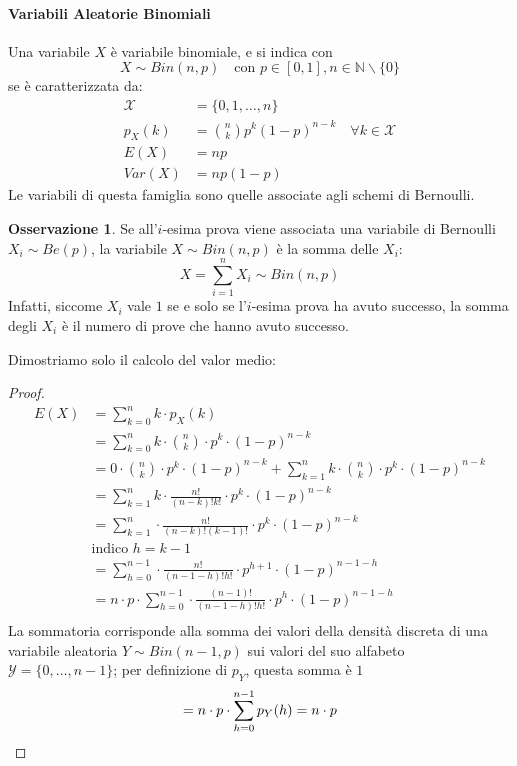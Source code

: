 \documentclass{article}
\theoremstyle{plain}
\theoremstyle{definition}
\newtheorem{osservazione}{Osservazione}[section]
\theoremstyle{remark}
\begin{document}
\paragraph{Variabili Aleatorie Binomiali} %
\label{par:variabili_aleatorie_binomiali}
Una variabile $X$ è variabile binomiale, e si indica con
\begin{equation*}
	X\sim Bin(n,p)\quad\text{con }p\in[0,1],n\in\mathds{N}\smallsetminus\{0\}
\end{equation*}
se è caratterizzata da:
\begin{align*}
	\mathcal{X}&=\{0,1,\dots,n\}\\
	p_X(k)&=\binom{n}{k} p^k (1-p)^{n-k}\quad\forall k\in\mathcal{X}\\
	E(X)&=n p\\
	Var(X)&=n p(1-p)
\end{align*}
Le variabili di questa famiglia sono quelle associate agli schemi di Bernoulli.
\begin{osservazione}
	Se all'$i$-esima prova viene associata una variabile di Bernoulli $X_i\sim Be(p)$, la variabile $X\sim Bin(n,p)$ è la somma delle $X_i$:
	\begin{equation*}
		X=\sum_{i=1}^n X_i\sim Bin(n,p)
	\end{equation*}
	Infatti, siccome $X_i$ vale $1$ se e solo se l'$i$-esima prova ha avuto successo, la somma degli $X_i$ è il numero di prove che hanno avuto successo.
\end{osservazione}
Dimostriamo solo il calcolo del valor medio:
\begin{proof}
	\begin{align*}
		E(X)&=\sum_{k=0}^n k\cdot p_X(k)\\
		&=\sum_{k=0}^n k\cdot\binom{n}{k}\cdot p^k\cdot (1-p)^{n-k}\\
		&=0\cdot\binom{n}{k}\cdot p^k\cdot (1-p)^{n-k}+\sum_{k=1}^n k\cdot\binom{n}{k}\cdot p^k\cdot (1-p)^{n-k}\\
		&=\sum_{k=1}^n k\cdot\frac{n!}{(n-k)!k!}\cdot p^k\cdot (1-p)^{n-k}\\
		&=\sum_{k=1}^n \cdot\frac{n!}{(n-k)!(k-1)!}\cdot p^k\cdot (1-p)^{n-k}\\
		&\text{indico $h=k-1$}\\
		&=\sum_{h=0}^{n-1} \cdot\frac{n!}{(n-1-h)!h!}\cdot p^{h+1}\cdot (1-p)^{n-1-h}\\
		&=n\cdot p\cdot\sum_{h=0}^{n-1} \cdot\frac{(n-1)!}{(n-1-h)!h!}\cdot p^h\cdot (1-p)^{n-1-h}\\
	\end{align*}
	La sommatoria corrisponde alla somma dei valori della densità discreta di una variabile aleatoria $Y\sim Bin(n-1,p)$ sui valori del suo alfabeto $\mathcal{Y}=\{0,\dots,n-1\}$; per definizione di $p_Y$, questa somma è $1$
	\begin{equation*}
		=n\cdot p\cdot\sum_{h=0}^{n-1} p_Y(h)=n\cdot p\qedhere
	\end{equation*}
\end{proof}
\end{document}
